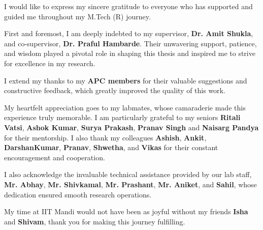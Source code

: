 %
\begin{Acknowledgements}	

I would like to express my sincere gratitude to everyone who has supported and guided me throughout my M.Tech (R) journey.

First and foremost, I am deeply indebted to my supervisor, \textbf{Dr. Amit Shukla}, and co-supervisor, \textbf{Dr. Praful Hambarde}. Their unwavering support, patience, and wisdom played a pivotal role in shaping this thesis and inspired me to strive for excellence in my research.

I extend my thanks to my \textbf{APC members} for their valuable suggestions and constructive feedback, which greatly improved the quality of this work.

My heartfelt appreciation goes to my labmates, whose camaraderie made this experience truly memorable. I am particularly grateful to my seniors \textbf{Ritali Vatsi}, \textbf{Ashok Kumar}, \textbf{Surya Prakash}, \textbf{Pranav Singh} and \textbf{Naisarg Pandya} for their mentorship. I also thank my colleagues \textbf{Ashish}, \textbf{Ankit}, \textbf{DarshanKumar}, \textbf{Pranav}, \textbf{Shwetha}, and \textbf{Vikas} for their constant encouragement and cooperation.

I also acknowledge the invaluable technical assistance provided by our lab staff, \textbf{Mr. Abhay}, \textbf{Mr. Shivkamal}, \textbf{Mr. Prashant}, \textbf{Mr. Aniket}, and \textbf{Sahil}, whose dedication ensured smooth research operations.

My time at IIT Mandi would not have been as joyful without my friends \textbf{Isha} and \textbf{Shivam}, thank you for making this journey fulfilling.


%
%
\signature[Indian Institute of Technology Mandi]{\today}
\end{Acknowledgements}














